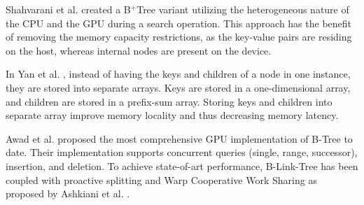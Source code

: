 Shahvarani et al. \cite{hb+tree} created a B$^+$Tree variant utilizing the heterogeneous nature of the CPU and the GPU during a search operation. This approach has the benefit of removing the memory capacity restrictions, as the key-value pairs are residing on the host, whereas internal nodes are present on the device.

In Yan et al. \cite{harmonia}, instead of having the keys and children of a node in one instance, they are stored into separate arrays. Keys are stored in a one-dimensional array, and children are stored in a prefix-sum array. Storing keys and children into separate array improve memory locality and thus decreasing memory latency.

Awad et al. \cite{awad} proposed the most comprehensive GPU implementation of B-Tree to date. Their implementation supports concurrent queries (single, range, successor), insertion, and deletion. To achieve state-of-art performance, B-Link-Tree has been coupled with proactive splitting and Warp Cooperative Work Sharing as proposed by Ashkiani et al. \cite{ashkiani2018dynamic}.

